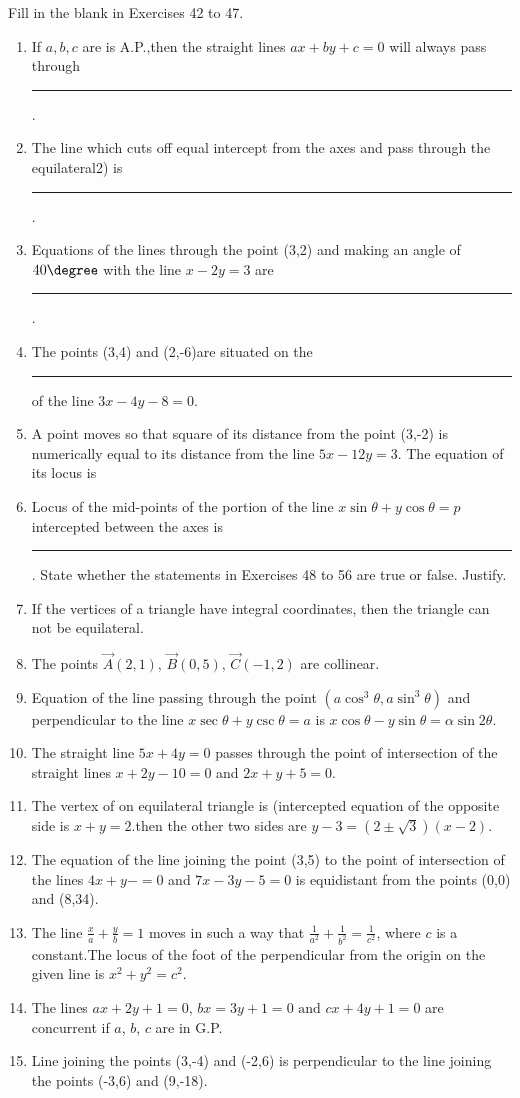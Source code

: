 Fill in the blank in Exercises 42 to 47.
\begin{enumerate}[resume]
\item If $a,b,c$ are is A.P.,then the straight lines $ax+by+c=0$ will always pass through \rule{1cm}{0.15mm}.
\item The line which cuts off equal intercept from the axes and pass through the equilateral2) is \rule{1cm}{0.15mm}.
\item Equations of the lines through the point (3,2) and making an angle of $40\degree$ with the line $x-2y=3$ are \rule{1cm}{0.15mm}.   
\item The points (3,4) and (2,-6)are situated on the \rule{1cm}{0.15mm} of the line $3x-4y-8=0$.
\item A point moves so that square of its distance from the point (3,-2) is numerically equal to its distance from the line $5x-12y=3$. The equation of its locus is %
\item Locus of the mid-points of the portion of the line $x\sin\theta+y\cos\theta=p$ intercepted between the axes is \rule{1cm}{0.15mm}.
State whether the statements in Exercises 48 to 56 are true or false. Justify.
\item If the vertices of a triangle have integral coordinates, then the triangle can not be equilateral.
\item The points $\vec{A}(2,1)$, $\vec{B}(0,5)$, $\vec{C}(-1,2)$ are collinear.
\item Equation of the line passing through the point $(a\cos^3\theta, a\sin^3\theta)$ and perpendicular to the line $x\sec\theta+y\csc\theta=a$ is $x\cos\theta-y\sin\theta=\alpha\sin2\theta$.
\item The straight line $5x+4y=0$ passes through the point of intersection of the straight lines $x+2y-10=0$ and $2x+y+5=0$.
\item The vertex of on equilateral triangle is (intercepted equation of the opposite side is $x+y=2$.then the other two sides are $y-3=(2\pm\sqrt{3})(x-2)$.
\item The equation of the line joining the point (3,5) to the point of intersection of the lines $4x+y-=0$ and $7x-3y-5=0$ is equidistant from the points (0,0) and (8,34).
\item The line $\frac{x}{a}+\frac{y}{b}=1$ moves in such a way that $\frac{1}{a^2}+\frac{1}{b^2}=\frac{1}{c^2}$, where $c$ is a constant.The locus of the foot of the perpendicular from the origin on the given line is $x^2+y^2=c^2$.
\item The lines $ax+2y+1=0$, $bx=3y+1=0\text{ and }cx+4y+1=0$ are concurrent if $a$, $b$, $c$ are in G.P.
\item Line joining the points (3,-4) and (-2,6) is perpendicular to the line joining the points (-3,6) and (9,-18).
\end{enumerate}
